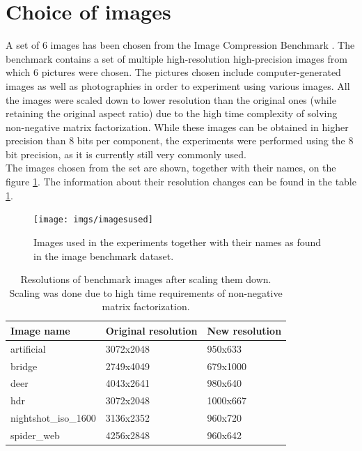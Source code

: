 \documentclass[thesis=M,english]{FITthesis}[2012/10/20]
\begin{document}
\section{Choice of images}
A set of 6 images has been chosen from the Image Compression Benchmark \cite{imgcomprbenchmark}.
The benchmark contains a set of multiple high-resolution high-precision images from which 6
pictures were chosen. The pictures chosen include computer-generated images as well as photographies
in order to experiment using various images. All the images were scaled down to lower resolution than
the original ones (while retaining the original aspect ratio) due to the high time complexity
of solving non-negative matrix factorization. While these images can be obtained in higher
precision than 8 bits per component, the experiments were performed using the 8 bit precision,
as it is currently still very commonly used.
\\

The images chosen from the set are shown, together with their names, on the
figure \ref{fig:benchmarkimages}. The information about their resolution changes
can be found in the table \ref{tab:benchmarkimagesresolutions}.

\begin{figure}[h]
  \centering
  \texttt{[image: imgs/imagesused]}
  \caption{Images used in the experiments together with their names as found in the
           image benchmark dataset.}
  \label{fig:benchmarkimages}
\end{figure}

\begin{table}[h]
\centering
\begin{tabular}{|l|l|l|}
\hline
\textbf{Image name}  & \textbf{Original resolution} & \textbf{New resolution} \\ \hline
artificial           & 3072x2048                    & 950x633                     \\ \hline
bridge               & 2749x4049                    & 679x1000                     \\ \hline
deer                 & 4043x2641                    & 980x640                     \\ \hline
hdr                  & 3072x2048                    & 1000x667                     \\ \hline
nightshot\_iso\_1600 & 3136x2352                    & 960x720                     \\ \hline
spider\_web          & 4256x2848                    & 960x642                     \\ \hline
\end{tabular}
\caption{Resolutions of benchmark images after scaling them down. Scaling was done
		due to high time requirements of non-negative matrix factorization.}
\label{tab:benchmarkimagesresolutions}
\end{table}
\end{document}
